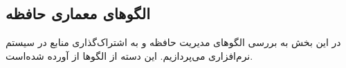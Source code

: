 \subsection{الگوهای معماری حافظه}
\begin{RTL}
در این بخش به بررسی الگوهای مدیریت حافظه و به اشتراک‌گذاری منابع در
سیستم نرم‌افزاری می‌پردازیم.
این دسته از الگوها از \cite{ref4} آورده شده‌است.
\end{RTL}





